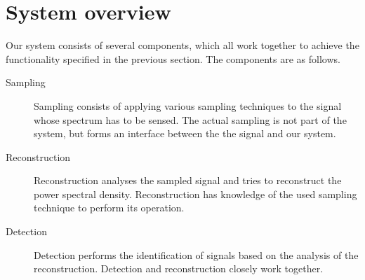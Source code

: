 \documentclass[a4paper, openany, oneside]{memoir}
\begin{document}











\section{System overview}
\label{sec:theory-system-overview}
Our system consists of several components, which all work together to achieve the functionality specified in the previous section. The components are as follows.

\begin{description}
    \item[Sampling] Sampling consists of applying various sampling techniques to the signal whose spectrum has to be sensed. The actual sampling is not part of the system, but forms an interface between the the signal and our system.
    \item[Reconstruction] Reconstruction analyses the sampled signal and tries to reconstruct the power spectral density. Reconstruction has knowledge of the used sampling technique to perform its operation.
    \item[Detection] Detection performs the identification of signals based on the analysis of the reconstruction. Detection and reconstruction closely work together.
\end{description}
\end{document}

